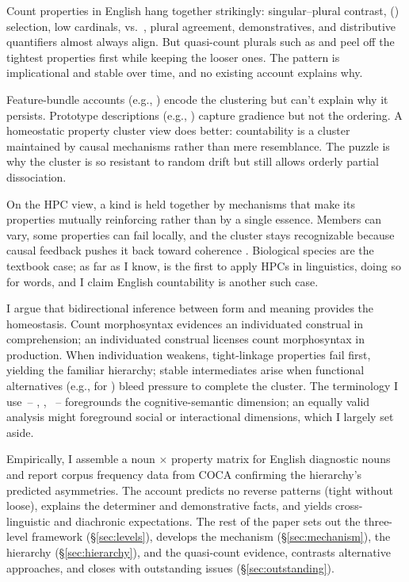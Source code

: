 \documentclass[12pt,a4paper]{article}
\begin{document}
Count properties in English hang together strikingly: singular--plural contrast, () selection, low cardinals,  vs.\ , plural agreement, demonstratives, and distributive quantifiers almost always align. But quasi-count plurals such as  and  peel off the tightest properties first while keeping the looser ones. The pattern is implicational and stable over time, and no existing account explains why.

Feature-bundle accounts (e.g., \citealt{lyons1968,quirk1985}) encode the clustering but can't explain why it persists. Prototype descriptions (e.g., \citealt{taylor2003,aarts2007}) capture gradience but not the ordering. A homeostatic property cluster view does better: countability is a cluster maintained by causal mechanisms rather than mere resemblance. The puzzle is why the cluster is so resistant to random drift but still allows orderly partial dissociation.

On the HPC view, a kind is held together by mechanisms that make its properties mutually reinforcing rather than by a single essence. Members can vary, some properties can fail locally, and the cluster stays recognizable because causal feedback pushes it back toward coherence \citep{boyd1991,khalidi2013}. Biological species are the textbook case; as far as I know, \textcite{miller2021} is the first to apply HPCs in linguistics, doing so for words, and I claim English countability is another such case.

I argue that bidirectional inference between form and meaning provides the homeostasis. Count morphosyntax evidences an individuated construal in comprehension; an individuated construal licenses count morphosyntax in production. When individuation weakens, tight-linkage properties fail first, yielding the familiar hierarchy; stable intermediates arise when functional alternatives (e.g.,  for ) bleed pressure to complete the cluster. The terminology I use~-- , , ~-- foregrounds the cognitive-semantic dimension; an equally valid analysis might foreground social or interactional dimensions, which I largely set aside.

Empirically, I assemble a noun $\times$ property matrix for English diagnostic nouns and report corpus frequency data from COCA \citep{davies2020coca} confirming the hierarchy's predicted asymmetries. The account predicts no reverse patterns (tight without loose), explains the determiner and demonstrative facts, and yields cross-linguistic and diachronic expectations. The rest of the paper sets out the three-level framework (\S\ref{sec:levels}), develops the mechanism (\S\ref{sec:mechanism}), the hierarchy (\S\ref{sec:hierarchy}), and the quasi-count evidence, contrasts alternative approaches, and closes with outstanding issues (\S\ref{sec:outstanding}).
\end{document}
